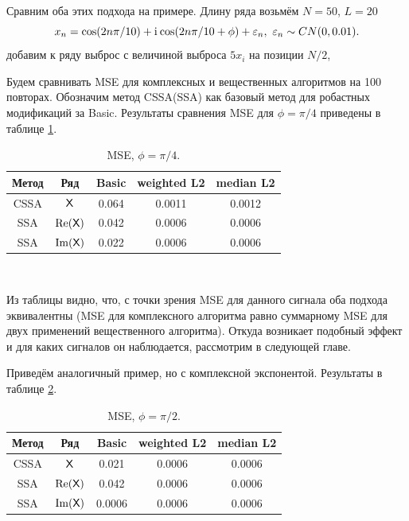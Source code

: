 \documentclass[specialist,
               substylefile = spbu.rtx,
               subf,href,colorlinks=true, 12pt]{disser}
\begin{document}
Сравним оба этих подхода на примере.
Длину ряда возьмём $N = 50$, $L = 20$
$$x_n = \cos(2n\pi/10) + \mathrm{i}\mkern1mu\cos(2n\pi/10 + \phi) + \varepsilon_n, ~ \varepsilon_n \sim CN(0,0.01).$$
добавим к ряду выброс с величиной выброса $5x_i$ на позиции $N/2$,

Будем сравнивать MSE для комплексных и вещественных алгоритмов на 100 повторах.
Обозначим метод CSSA(SSA) как базовый метод для робастных модификаций за Basic.
Результаты сравнения MSE для $\phi = \pi / 4$ приведены в таблице \ref{tab:th_ex}.
\begin{table}[H]
	\caption{MSE, $\phi = \pi / 4$.}
	\label{tab:th_ex}
	\begin{center}
		\begin{tabular}{|c|c|c|c|c|}
			\hline
			Метод & Ряд & Basic & weighted L2 & median L2\\
			\hline
			CSSA & $\textsf{X}$ & 0.064 & 0.0011 & 0.0012\\
			\hline
			SSA & $\Re(\textsf{X})$ & 0.042 & 0.0006 &   0.0006\\
			\hline
			SSA & $\Im(\textsf{X})$ & 0.022   & 0.0006 &   0.0006\\
			\hline
		\end{tabular} \\
	\end{center}
\end{table}

Из таблицы видно, что, с точки зрения MSE для данного сигнала оба подхода эквивалентны (MSE для комплексного алгоритма равно суммарному MSE для двух применений вещественного алгоритма). Откуда возникает подобный эффект и для каких сигналов он наблюдается, рассмотрим в следующей главе.

Приведём аналогичный пример, но с комплексной экспонентой. Результаты в таблице \ref{tab:th_ex_exp}.

\begin{table}[H]
	\caption{MSE, $\phi = \pi / 2$.}
	\label{tab:th_ex_exp}
	\begin{center}
		\begin{tabular}{|c|c|c|c|c|}
			\hline
			Метод & Ряд & Basic & weighted L2 & median L2 \\
			\hline
			CSSA & $\textsf{X}$ & 0.021 & 0.0006 & 0.0006\\
			\hline
			SSA & $\Re(\textsf{X})$ & 0.042 & 0.0006 &   0.0006\\
			\hline
			SSA & $\Im(\textsf{X})$ & 0.0006   & 0.0006 &   0.0006\\
			\hline
		\end{tabular} \\
	\end{center}
\end{table}
\end{document}
